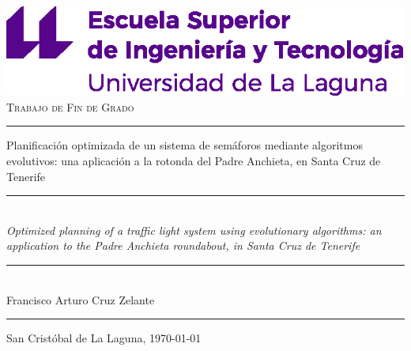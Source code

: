\documentclass[spanish,a4paper,12pt,oneside,notitlepage]{extreport}
\begin{document}

\pagestyle{empty}
\thispagestyle{empty}

\newcommand{\HRule}{\rule{\linewidth}{1mm}}
\setlength{\parindent}{0mm}
\setlength{\parskip}{0mm}


\begin{center}
  \includegraphics[scale=1]{images/logo-esit}\\[10mm]
  {\huge \scshape Trabajo de Fin de Grado}
\end{center}

\HRule
\begin{center}
  \vspace{1em}
  {\Huge Planificación optimizada de un sistema de semáforos mediante algoritmos evolutivos: una aplicación a la rotonda del Padre Anchieta, en Santa Cruz de Tenerife} \\[3mm]
  \rule{5cm}{0.6pt}\\[5mm]
  {\Large \textit{Optimized planning of a traffic light system using evolutionary algorithms: an application to the Padre Anchieta roundabout, in Santa Cruz de Tenerife}} \\[3mm]
  \rule{5cm}{0.6pt}\\[5mm]
  {\Large Francisco Arturo Cruz Zelante}
\end{center}
\HRule


\begin{center}
  \Large San Cristóbal de La Laguna, \today
\end{center}

\titleformat{\chapter}[display]
{\normalfont%
    \LARGE%
    \itshape}{\chaptertitlename\ \thechapter}{20pt}{%
    \normalfont \bfseries \Huge %
}
\end{document}

